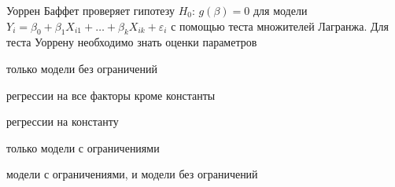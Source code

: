 
\begin{question}
Уоррен Баффет проверяет гипотезу \(H_0\): \(g(\beta)=0\) для модели
\(Y_i = \beta_0 + \beta_1 X_{i1} + \ldots + \beta_k X_{ik} + \varepsilon_i\)
с помощью теста множителей Лагранжа. Для теста Уоррену необходимо знать
оценки параметров
\begin{answerlist}
  \item только модели без ограничений
  \item регрессии на все факторы кроме константы
  \item регрессии на константу
  \item только модели с ограничениями
  \item модели с ограничениями, и модели без ограничений
\end{answerlist}
\end{question}


